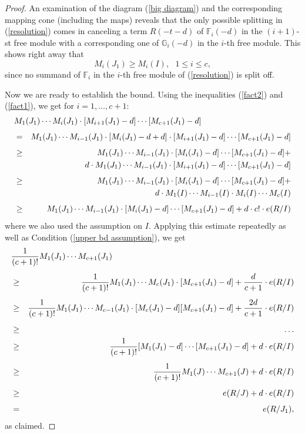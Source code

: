 \documentclass[12pt,twoside]{amsart}
\numberwithin{equation}{section}
\theoremstyle{definition}
\begin{document}
\begin{proof}
An examination of the diagram (\ref{big diagram})  and the corresponding mapping cone
(including the maps) reveals that the only possible splitting in (\ref{resolution}) comes
in canceling a term $R(-t-d)$ of $\mathbb F_{i}(-d)$ in the $(i+1)$-st free module with a
corresponding one of $\mathbb G_i(-d)$ in the $i$-th free module.  This shows right away
that
\begin{equation}\label{fact1}
M_i(J_1) \geq M_i(I), \ \ \ 1 \leq i \leq c,
\end{equation}
since no summand of $\mathbb F_i$ in the $i$-th free module of (\ref{resolution}) is split off.

Now we are ready to establish the bound. Using  the inequalities (\ref{fact2}) and
(\ref{fact1}), we get for $i = 1,\dots,c+1$:
\begin{eqnarray*}
\lefteqn{M_1(J_1) \cdots M_i(J_1) \cdot [M_{i+1}(J_1) - d] \cdots [M_{c+1}(J_1) - d] } \\[1ex]
& = & M_1(J_1) \cdots M_{i-1} (J_1) \cdot [M_i(J_1) - d + d] \cdot [M_{i+1}(J_1) - d] \cdots
[M_{c+1}(J_1) - d]  \\[1ex]
& \geq & M_1(J_1) \cdots M_{i-1} (J_1) \cdot [M_{i}(J_1) - d] \cdots [M_{c+1}(J_1) - d] +
\\
& &
    d \cdot M_1(J_1) \cdots M_{i-1} (J_1) \cdot [M_{i+1}(J_1) - d] \cdots [M_{c+1}(J_1) - d] \\[1ex]
& \geq & M_1(J_1) \cdots M_{i-1} (J_1) \cdot [M_{i}(J_1) - d] \cdots [M_{c+1}(J_1) - d] +
\\
& &
    d \cdot M_1(I) \cdots M_{i-1} (I) \cdot M_{i} (I) \cdots M_{c}(I) \\[1ex]
& \geq & M_1(J_1) \cdots M_{i-1} (J_1) \cdot [M_{i}(J_1) - d] \cdots [M_{c+1}(J_1) - d] +
d \cdot c! \cdot e(R/I)
\end{eqnarray*}
where we also used the assumption on $I$. Applying this estimate repeatedly as well as
Condition (\ref{upper bd assumption}), we get
\begin{eqnarray*}
\lefteqn{ \frac{1}{(c+1)!} M_1(J_1) \cdots  M_{c+1}(J_1) } \\[1ex]
& \geq & \frac{1}{(c+1)!} M_1(J_1) \cdots M_{c} (J_1) \cdot [M_{c+1}(J_1) - d] +
\frac{d}{c+1}
\cdot e(R/I) \\[1ex]
& \geq & \frac{1}{(c+1)!} M_1(J_1) \cdots M_{c-1} (J_1) \cdot [M_c (J_1) - d] [
M_{c+1}(J_1) - d]  + \frac{2 d}{c+1}
\cdot e(R/I) \\[1ex]
& \geq & \ldots \\
& \geq & \frac{1}{(c+1)!} [M_1(J_1) - d] \cdots  [M_{c+1}(J_1) - d]  + d \cdot e(R/I) \\[1ex]
& \geq & \frac{1}{(c+1)!} M_1(J) \cdots  M_{c+1}(J) + d \cdot e(R/I) \\[1ex]
& \geq & e(R/J) + d \cdot e(R/I) \\[1ex]
& = & e(R/J_1),
\end{eqnarray*}
as claimed.
\end{proof}
\end{document}
